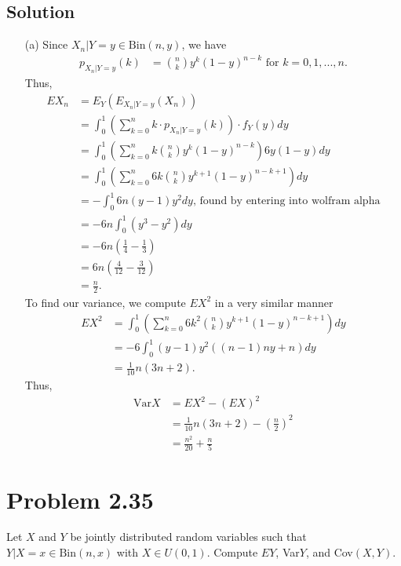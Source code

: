 \documentclass[10pt,a4paper]{article}
\theoremstyle{theorem}
\theoremstyle{definition}
\begin{document}
\subsection*{Solution}
\begin{enumerate}
\item[(a)] Since $X_n | Y = y \in \text{Bin}(n, y)$, we have
\begin{align*}
p_{X_n | Y = y}(k) &= {n \choose k} y^k (1 - y)^{n - k} \text{ for } k = 0, 1, ..., n.
\end{align*}
Thus, 
\begin{align*}
EX_n &= E_Y(E_{X_n|Y = y}(X_n))\\
&= \int_0^1 \left( \sum_{k = 0}^n  k \cdot p_{X_n | Y = y}(k)\right) \cdot f_Y(y) dy\\
&= \int_0^1 \left( \sum_{k = 0}^n k {n \choose k} y^k (1 - y)^{n - k} \right) 6y(1 - y) dy\\
&= \int_0^1 \left( \sum_{k = 0}^n  6k {n \choose k}  y^{k+1} (1 - y)^{n - k + 1} \right) dy\\
&= -\int_0^1 6n(y-1)y^2 dy \text{, found by entering into wolfram alpha} \\
&= -6n \int_0^1 (y^3 - y^2) dy\\
&= -6n(\frac{1}{4} - \frac{1}{3})\\
&= 6n(\frac{4}{12} - \frac{3}{12})\\
&= \boxed{\frac{n}{2}}.
\end{align*}
To find our variance, we compute $EX^2$ in a very similar manner
\begin{align*}
EX^2 &= \int_0^1 \left( \sum_{k = 0}^n  6k^2 {n \choose k}  y^{k+1} (1 - y)^{n - k + 1} \right) dy\\ 
&= -6 \int_0^1 (y-1)y^2((n-1)ny + n)dy\\
&= \frac{1}{10}n(3n + 2).
\end{align*}
Thus,
\begin{align*}
\text{Var}X &= EX^2 - (EX)^2\\
&= \frac{1}{10}n(3n + 2) - \left(\frac{n}{2}\right)^2\\
&= \boxed{\frac{n^2}{20} + \frac{n}{5}}
\end{align*}
\end{enumerate}

\section*{Problem 2.35}
Let $X$ and $Y$ be jointly distributed random variables such that $Y|X = x \in \text{Bin}(n, x)$ with $X \in U(0, 1)$. Compute $EY$, Var$Y$, and Cov$(X, Y)$.
\end{document}
